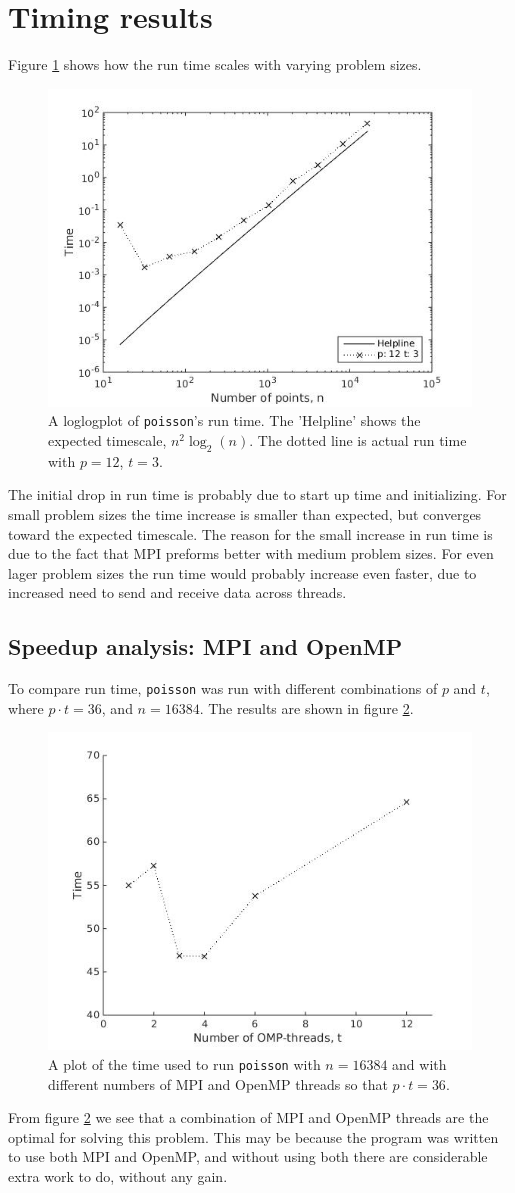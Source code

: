 \documentclass{article}
\begin{document}
\section{Timing results}
Figure \ref{fig:timscl} shows how the run time scales with varying problem sizes. 
\begin{figure}[h]
    \centering
    \includegraphics[width = 0.6\linewidth]{timscl}
    \caption{A loglogplot of \texttt{poisson}'s run time. The 'Helpline' shows the expected timescale, $n^2 \log_2(n)$. The dotted line is actual run time with $p = 12$, $t=3$.}
    \label{fig:timscl}
\end{figure}
The initial drop in run time is probably due to start up time and initializing. For small problem sizes the time increase is smaller than expected, but converges toward the expected timescale. The reason for the small increase in run time is due to the fact that MPI preforms better with medium problem sizes. For even lager problem sizes the run time would probably increase even faster, due to increased need to send and receive data across threads.

\subsection{Speedup analysis: MPI and OpenMP}
To compare run time, \texttt{poisson} was run with different combinations of $p$ and $t$, where $p\cdot t = 36$, and $n = 16384$. The results are shown in figure \ref{fig:time}.
\begin{figure}[h]
    \centering
    \includegraphics[width = 0.6\linewidth]{time1}
    \caption{A plot of the time used to run \texttt{poisson} with $n = 16384$ and with different numbers of MPI and OpenMP threads so that $p\cdot t = 36$. }
    \label{fig:time}
\end{figure}
From figure \ref{fig:time} we see that a combination of MPI and OpenMP threads are the optimal for solving this problem. This may be because the program was written to use both MPI and OpenMP, and without using both there are considerable extra work to do, without any gain.
\end{document}
